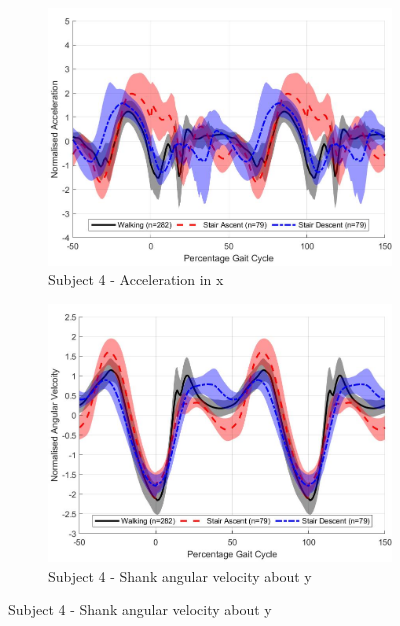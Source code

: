 \documentclass[sensors,article,submit,moreauthors,pdftex]{Definitions/mdpi}
\begin{document}
\begin{figure}[!htb]
     \centering
     \begin{subfigure}[b]{0.49\textwidth}
         \centering
         \includegraphics[width=\textwidth]{Figures/gait_trends/accel_x_trend_Participant_04.jpg}
         \caption{Subject 4 - Acceleration in x}
         \label{subfig:x_accel_subj_4}
     \end{subfigure}
     \hfill
     \begin{subfigure}[b]{0.49\textwidth}
         \centering
         \includegraphics[width=\textwidth]{Figures/gait_trends/gyro_y_trend_Participant_04.jpg}
         \caption{Subject 4 - Shank angular velocity about y}
         \label{subfig:x_gyro_subj_4}
     \end{subfigure}

\end{figure}
\end{document}
